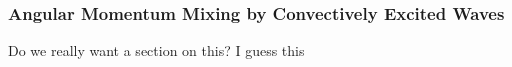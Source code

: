 {\color{purple}
\subsubsection{Angular Momentum Mixing by Convectively Excited Waves}}

Do we really want a section on this?  I guess this 
